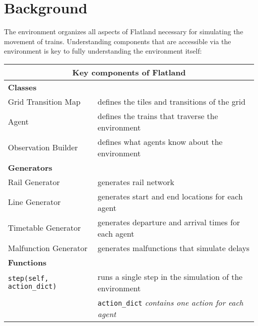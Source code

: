 \section{Background}\label{sec:background}

The environment organizes all aspects of Flatland necessary for simulating the movement of trains.  
Understanding components that are accessible via the environment is key to fully understanding the environment itself: \\

\begin{table}[H]
\centering
	{\footnotesize
  	\begin{tabular}{@{\hspace*{1em}}ll@{}}
    	\toprule \toprule
    	\multicolumn{2}{c}{Key components of Flatland} \\

    	\midrule

    	\textbf{Classes} \\
    	\tabitem Grid Transition Map & defines the tiles and transitions of the grid \\
    	\tabitem Agent & defines the trains that traverse the environment \\
    	\tabitem Observation Builder & defines what agents know about the environment \\[.75\normalbaselineskip]
    
	\textbf{Generators} \\
    	\tabitem Rail Generator & generates rail network \\
	\tabitem Line Generator & generates start and end locations for each agent \\
    	\tabitem Timetable Generator & generates departure and arrival times for each agent \\
	\tabitem Malfunction Generator & generates malfunctions that simulate delays \\[.75\normalbaselineskip]
    
	\textbf{Functions} \\
	\tabitem \texttt{step(self, action\_dict)} & runs a single step in the simulation of the environment \\
	 & \texttt{action\_dict} \textit{contains one action for each agent} \\

	\bottomrule
  	\end{tabular}
	}
\end{table}

